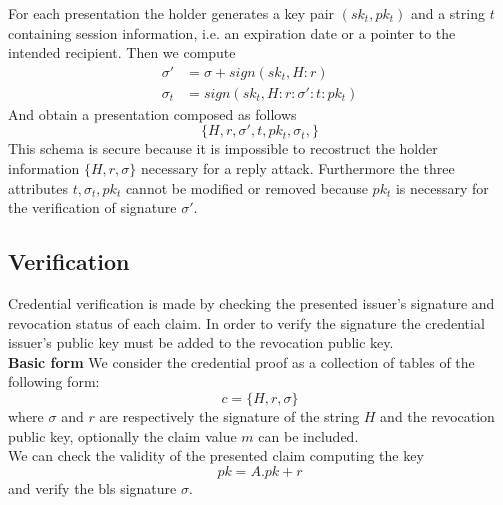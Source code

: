 For each presentation the holder generates a key pair $(sk_t, pk_t)$
and a string $t$ containing session information, i.e. an expiration
date or a pointer to the intended recipient. Then we compute
\begin{equation*}
    \begin{split}
        \sigma' &= \sigma + sign(sk_t, H : r) \\
        \sigma_{t} &= sign(sk_t, H : r : \sigma' : t : pk_t)
    \end{split}
\end{equation*}
And obtain a presentation composed as follows
\begin{equation*}
    \{H, r, \sigma', t, pk_t,  \sigma_t,\}
\end{equation*}
This schema is secure because it is impossible to recostruct the holder information $\{H,r,\sigma\}$ necessary for a reply attack. Furthermore the three attributes $t,\sigma_t, pk_t$ cannot be modified or removed because $pk_t$ is necessary for the verification of signature $\sigma'$.

\subsection{Verification}

Credential verification is made by checking the presented issuer's
signature and revocation status of each claim. In order to verify the signature the credential issuer's public key must
be added to the revocation public key.\\
\textbf{Basic form}
We consider the credential proof as a
collection of tables of the following form:
\begin{equation*}
    c = \{H, r, \sigma \}
\end{equation*}
where $\sigma$ and $r$ are respectively the signature of the string
$H$ and the revocation public key, optionally the claim value $m$ can be included.\\
We can check the validity of the
presented claim computing the key
\begin{equation*}
    pk = A.pk + r
\end{equation*}
and verify the bls signature $\sigma$.

